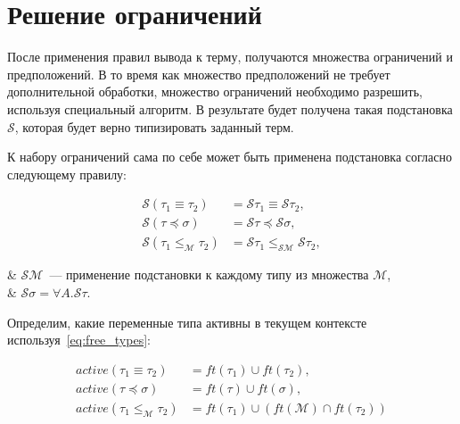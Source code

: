 \section{Решение ограничений}
\label{sec:constraint_solving}

После применения правил вывода к терму, получаются множества ограничений и предположений.
В то время как множество предположений не требует дополнительной обработки, множество ограничений необходимо разрешить, используя специальный алгоритм.
В результате будет получена такая подстановка $\mathcal{S}$, которая будет верно типизировать заданный терм.

К набору ограничений сама по себе может быть применена подстановка согласно следующему правилу:

\begin{equation}
    \label{eq:consts_subst}
    \begin{aligned}
        \mathcal{S} (\tau_1 \equiv \tau_2)             &= \mathcal{S} \tau_1 \equiv \mathcal{S} \tau_2, \\
        \mathcal{S} (\tau \preceq \sigma)              &= \mathcal{S} \tau \preceq \mathcal{S} \sigma,  \\
        \mathcal{S} (\tau_1 \leq_{\mathcal{M}} \tau_2) &= \mathcal{S} \tau_1 \leq_{\mathcal{S} \mathcal{M}} \mathcal{S} \tau_2,
    \end{aligned}
\end{equation}
\begin{eqrem}
    & $\mathcal{S} \mathcal{M}$~--- применение подстановки к каждому типу из множества $\mathcal{M}$, \\
    & $\mathcal{S} \sigma = \forall A. \mathcal{S} \tau$.                                             \\
\end{eqrem}

Определим, какие переменные типа активны в текущем контексте используя~\ref{eq:free_types}:

\begin{equation}
    \label{eq:active_vars}
    \begin{aligned}
        active(\tau_1 \equiv \tau_2) &= ft(\tau_1) \cup ft(\tau_2), \\
        active(\tau \preceq \sigma) &= ft(\tau) \cup ft(\sigma), \\
        active(\tau_1 \leq_{\mathcal{M}} \tau_2) &= ft(\tau_1) \cup (ft(\mathcal{M}) \cap ft(\tau_2))
    \end{aligned}
\end{equation}

